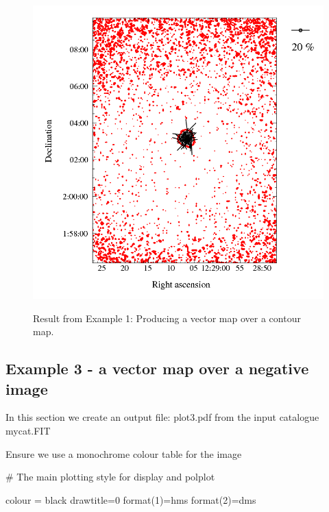 \begin{figure}[t!]
\begin{center}
\includegraphics[width=0.75\linewidth]{sc22-kappa-plots-plot2.png}
\label{fig:kappa-plot2}
\caption [Vector map with contour map in polplot]{
  \small Result from Example 1: Producing a vector map over a contour map. 
}
\end{center}
\end{figure}

\subsection{ Example 3 - a vector map over a negative image}
\label{section:kappa-example3}


In this section we create an output file: plot3.pdf from the input catalogue mycat.FIT

\begin{terminalv}
\end{terminalv}


Ensure we use a monochrome colour table for the image

\begin{terminalv}
\end{terminalv}


#  The main plotting style for display and polplot

\begin{terminalv}
colour = black
drawtitle=0
format(1)=hms
format(2)=dms
\end{terminalv}


